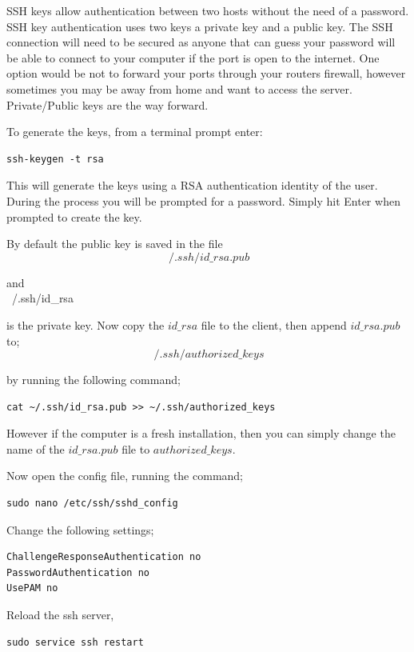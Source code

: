 SSH keys allow authentication between two hosts without the need of a password. SSH key authentication uses two keys a private key and a public key.  The SSH connection will need to be secured as anyone that can guess your password will be able to connect to your computer if the port is open to the internet.  One option would be not to forward your ports through your routers firewall, however sometimes you may be away from home and want to access the server.  Private/Public keys are the way forward.


To generate the keys, from a terminal prompt enter:

\begin{lstlisting}
ssh-keygen -t rsa
\end{lstlisting}

This will generate the keys using a RSA authentication identity of the user. During the process you will be prompted for a password. Simply hit Enter when prompted to create the key.

By default the public key is saved in the file
$$
 ~/.ssh/id\_rsa.pub
$$

and
$$
$$
~/.ssh/id\_rsa

is the private key. Now copy the $id\_rsa$ file to the client, then append $id\_rsa.pub$ to;
$$
~/.ssh/authorized\_keys
$$

by running the following command;

\begin{lstlisting}
cat ~/.ssh/id_rsa.pub >> ~/.ssh/authorized_keys
\end{lstlisting}

However if the computer is a fresh installation, then you can simply change the name of the $id\_rsa.pub$ file to $authorized\_keys$.

Now open the config file, running the command;

\begin{lstlisting}
sudo nano /etc/ssh/sshd_config
\end{lstlisting}

Change the following settings;

\begin{lstlisting}
ChallengeResponseAuthentication no
PasswordAuthentication no
UsePAM no
\end{lstlisting}

Reload the ssh server,

\begin{lstlisting}
sudo service ssh restart
\end{lstlisting}

